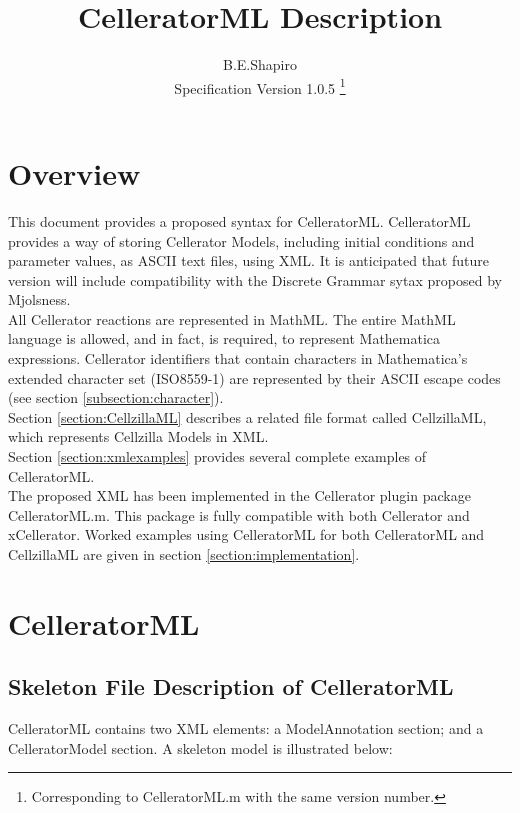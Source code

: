\documentclass[12pt,letterpaper]{article}
\title{CelleratorML Description}
\author{B.E.Shapiro\\Specification Version 1.0.5 {\footnote {Corresponding to CelleratorML.m with the same version number.}}}
\begin{document}
\maketitle
\tableofcontents

\setlength{\parindent}{0pt}
\section{Overview}

This document provides a proposed syntax for CelleratorML.  CelleratorML provides a way of storing Cellerator Models, including initial conditions and parameter values, as ASCII text files, using XML. It is anticipated that future version will include compatibility with the Discrete Grammar sytax proposed by Mjolsness. \\

All Cellerator reactions are represented in MathML. The entire MathML language is allowed, and in fact, is required, to represent Mathematica expressions. Cellerator identifiers that contain characters in Mathematica's extended character set (ISO8559-1) are represented by their ASCII escape codes (see section \ref{subsection:character}).\\

Section \ref{section:CellzillaML} describes a related file format called CellzillaML, which represents Cellzilla Models in XML. \\

Section \ref{section:xmlexamples} provides several complete examples of CelleratorML. \\

The proposed XML has been implemented in the Cellerator plugin package CelleratorML.m. This package is fully compatible with both Cellerator and xCellerator. Worked examples using CelleratorML for both CelleratorML and CellzillaML are given in section \ref{section:implementation}.

\section{CelleratorML}

\subsection{Skeleton File Description of CelleratorML}

CelleratorML contains two XML elements: a ModelAnnotation section; and a CelleratorModel section. A skeleton model is illustrated below: 
\end{document}

